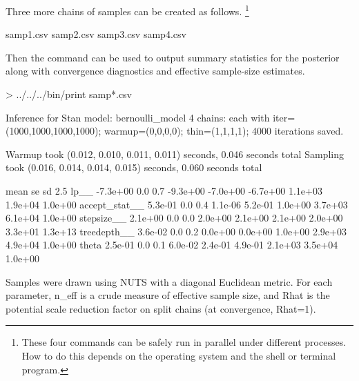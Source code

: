 \documentclass[article]{jss}
\begin{document}
Three more chains of samples can be created as follows.%
%
\footnote{These four commands can be safely run in parallel under
  different processes.  How to do this depends on the operating system
  and the shell or terminal program.}
%
\begin{CodeChunk}
\begin{CodeOutput}
samp1.csv	samp2.csv	samp3.csv	samp4.csv
\end{CodeOutput}
\end{CodeChunk}
%
Then the  command can be used to output summary
statistics for the posterior along with convergence diagnostics and
effective sample-size estimates.
%
\begin{CodeChunk}
\begin{CodeInput}
> ../../../bin/print samp*.csv
\end{CodeInput}
\small
\begin{CodeOutput}
Inference for Stan model: bernoulli_model
4 chains: each with iter=(1000,1000,1000,1000); warmup=(0,0,0,0); thin=(1,1,1,1); 
4000 iterations saved.

Warmup took (0.012, 0.010, 0.011, 0.011) seconds, 0.046 seconds total
Sampling took (0.016, 0.014, 0.014, 0.015) seconds, 0.060 seconds total

                   mean   se   sd     2.5%
lp__           -7.3e+00  0.0  0.7 -9.3e+00 -7.0e+00 -6.7e+00 1.1e+03 1.9e+04 1.0e+00
accept_stat__   5.3e-01  0.0  0.4  1.1e-06  5.2e-01  1.0e+00 3.7e+03 6.1e+04 1.0e+00
stepsize__      2.1e+00  0.0  0.0  2.0e+00  2.1e+00  2.1e+00 2.0e+00 3.3e+01 1.3e+13
treedepth__     3.6e-02  0.0  0.2  0.0e+00  0.0e+00  1.0e+00 2.9e+03 4.9e+04 1.0e+00
theta           2.5e-01  0.0  0.1  6.0e-02  2.4e-01  4.9e-01 2.1e+03 3.5e+04 1.0e+00

Samples were drawn using NUTS with a diagonal Euclidean metric.
For each parameter, n_eff is a crude measure of effective sample size,
and Rhat is the potential scale reduction factor on split chains (at 
convergence, Rhat=1).
\end{CodeOutput}
\end{CodeChunk}
\end{document}
